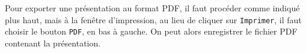 Pour exporter une présentation au format PDF, il faut procéder comme indiqué plus haut, mais à la fenêtre d'impression, au lieu de cliquer sur \texttt{Imprimer}, il faut choisir le bouton \texttt{PDF}, en bas à gauche. On peut alors enregistrer le fichier PDF contenant la présentation.



\vfill
\phantom{rien}






